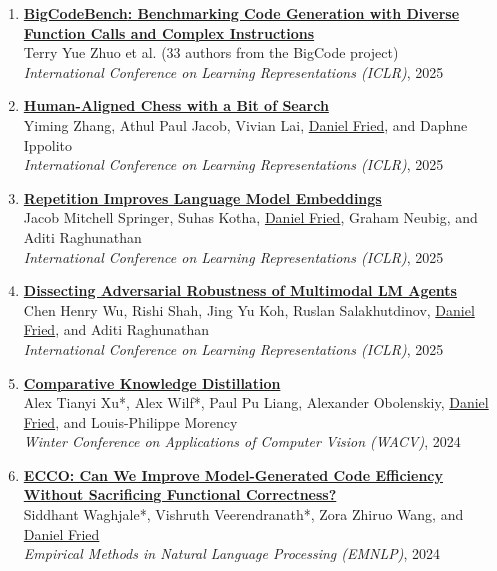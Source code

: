 \begin{enumerate}[leftmargin=-1mm,partopsep=0pt]
\item \href{https://arxiv.org/abs/2406.15877}{\textbf{{BigCodeBench}: Benchmarking Code Generation with Diverse Function Calls and Complex Instructions}} \\
  Terry Yue Zhuo et al. (33 authors from the BigCode project)\\
  \emph{International Conference on Learning Representations (ICLR)}, 2025

\item \href{https://arxiv.org/abs/2410.03893}{\textbf{Human-Aligned Chess with a Bit of Search}} \\
  Yiming Zhang, Athul Paul Jacob, Vivian Lai, \underline{Daniel Fried}, and Daphne Ippolito\\
  \emph{International Conference on Learning Representations (ICLR)}, 2025

\item \href{https://arxiv.org/abs/2402.15449}{\textbf{Repetition Improves Language Model Embeddings}} \\
  Jacob Mitchell Springer, Suhas Kotha, \underline{Daniel Fried}, Graham Neubig, and Aditi Raghunathan\\
  \emph{International Conference on Learning Representations (ICLR)}, 2025

\item \href{https://arxiv.org/abs/2406.12814}{\textbf{Dissecting Adversarial Robustness of Multimodal LM Agents}} \\
  Chen Henry Wu, Rishi Shah, Jing Yu Koh, Ruslan Salakhutdinov, \underline{Daniel Fried}, and Aditi Raghunathan\\
  \emph{International Conference on Learning Representations (ICLR)}, 2025

\item \href{https://arxiv.org/abs/2311.02253}{\textbf{Comparative Knowledge Distillation}} \\
  Alex Tianyi Xu*, Alex Wilf*, Paul Pu Liang, Alexander Obolenskiy, \underline{Daniel Fried}, and Louis-Philippe Morency\\
  \emph{Winter Conference on Applications of Computer Vision (WACV)}, 2024

\item \href{http://arxiv.org/abs/2407.14044}{\textbf{ECCO: Can We Improve Model-Generated Code Efficiency Without Sacrificing Functional Correctness?}} \\
  Siddhant Waghjale*, Vishruth Veerendranath*, Zora Zhiruo Wang, and \underline{Daniel Fried}\\
  \emph{Empirical Methods in Natural Language Processing (EMNLP)}, 2024


\end{enumerate}
